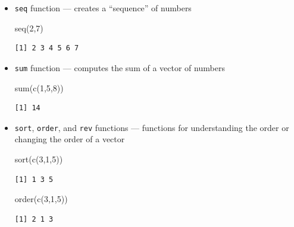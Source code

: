 \documentclass[
  letterpaper,
  DIV=11,
  numbers=noendperiod]{scrreprt}
\newenvironment{Shaded}{\begin{snugshade}}{\end{snugshade}}
\newcommand{\DecValTok}[1]{\textcolor[rgb]{0.68,0.00,0.00}{#1}}
\newcommand{\FunctionTok}[1]{\textcolor[rgb]{0.28,0.35,0.67}{#1}}
\newcommand{\NormalTok}[1]{\textcolor[rgb]{0.00,0.23,0.31}{#1}}
\begin{document}
\begin{itemize}
\item
  \texttt{seq} function --- creates a ``sequence'' of numbers

\begin{Shaded}
\begin{Highlighting}[]
\FunctionTok{seq}\NormalTok{(}\DecValTok{2}\NormalTok{,}\DecValTok{7}\NormalTok{)}
\end{Highlighting}
\end{Shaded}

\begin{verbatim}
[1] 2 3 4 5 6 7
\end{verbatim}
\item
  \texttt{sum} function --- computes the sum of a vector of numbers

\begin{Shaded}
\begin{Highlighting}[]
\FunctionTok{sum}\NormalTok{(}\FunctionTok{c}\NormalTok{(}\DecValTok{1}\NormalTok{,}\DecValTok{5}\NormalTok{,}\DecValTok{8}\NormalTok{))}
\end{Highlighting}
\end{Shaded}

\begin{verbatim}
[1] 14
\end{verbatim}
\item
  \texttt{sort}, \texttt{order}, and \texttt{rev} functions ---
  functions for understanding the order or changing the order of a
  vector

\begin{Shaded}
\begin{Highlighting}[]
\FunctionTok{sort}\NormalTok{(}\FunctionTok{c}\NormalTok{(}\DecValTok{3}\NormalTok{,}\DecValTok{1}\NormalTok{,}\DecValTok{5}\NormalTok{))}
\end{Highlighting}
\end{Shaded}

\begin{verbatim}
[1] 1 3 5
\end{verbatim}

\begin{Shaded}
\begin{Highlighting}[]
\FunctionTok{order}\NormalTok{(}\FunctionTok{c}\NormalTok{(}\DecValTok{3}\NormalTok{,}\DecValTok{1}\NormalTok{,}\DecValTok{5}\NormalTok{))}
\end{Highlighting}
\end{Shaded}

\begin{verbatim}
[1] 2 1 3
\end{verbatim}


\end{itemize}
\end{document}
